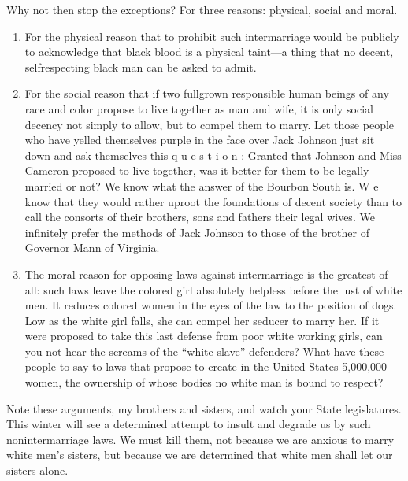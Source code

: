 \documentclass[letterpaper,10pt,english]{jupyterBook}
\begin{document}
\sphinxAtStartPar
Why not then stop the exceptions? For three reasons: physical, social and moral.
\begin{enumerate}
%
\item {} 
\sphinxAtStartPar
For the physical reason that to prohibit such intermarriage would be publicly to acknowledge that black blood is a physical taint—a thing that no decent, self\sphinxhyphen{}respecting black man can be asked to admit.

\item {} 
\sphinxAtStartPar
For the social reason that if two full\sphinxhyphen{}grown responsible human beings of any race and color propose to live to­gether as man and wife, it is only social decency not simply to allow, but to com­pel them to marry. Let those people who have yelled themselves purple in the face over Jack Johnson just sit down and ask themselves this q u e s t i o n : Granted that Johnson and Miss Cameron proposed to live together, was it better for them to be legally married or not? We know what the answer of the Bourbon South is. W e know that they would rather uproot the foundations of decent society than to call the consorts of their brothers, sons and fathers their legal wives. We infinitely prefer the methods of Jack Johnson to those of the brother of Governor Mann of Virginia.

\item {} 
\sphinxAtStartPar
The moral reason for opposing laws against intermarriage is the greatest of all: such laws leave the colored girl absolutely helpless before the lust of white men. It reduces colored women in the eyes of the law to the position of  dogs. Low as the white girl falls, she can compel her seducer to marry her. If it were proposed to take this last defense from poor white working girls, can you not hear the screams of the “white slave” defenders? What have these people to say to laws that propose to create in the United States 5,000,000 women, the ownership of whose bodies no white man is bound to respect?

\end{enumerate}

\sphinxAtStartPar
Note these arguments, my brothers and sisters, and watch your State legislatures. This winter will see a determined attempt to insult and degrade us by such non\sphinxhyphen{}intermarriage laws. We must kill them, not because we are anxious to marry white men’s sisters, but because we are determined that white men shall let our sisters alone.
\end{document}
